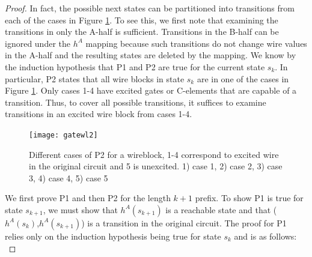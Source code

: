 \documentclass[12pt]{report}
\begin{document}
\begin{proof}
In fact, the possible next states can be partitioned into transitions from each of the cases in Figure \ref{fig:l1helper}.  To see this, we first note that examining the transitions in only the A-half is sufficient.  Transitions in the B-half can be ignored under the $h^A$ mapping because such transitions do not change wire values in the A-half and the resulting states are deleted by the mapping.  We know by the induction hypothesis that P1 and P2 are true for the current state $s_k$.  In particular, P2 states that all wire blocks in state $s_k$ are in one of the cases in Figure \ref{fig:l1helper}.  Only cases 1-4 have excited gates or C-elements that are capable of a transition.  Thus, to cover all possible transitions, it suffices to examine transitions in an excited wire block from cases 1-4. \\

 

\begin{figure}
  \centering
    \texttt{[image: gatewl2]}
  \caption{Different cases of P2 for a wireblock, 1-4 correspond to excited wire in the original circuit and 5 is unexcited.  1) case 1, 2) case 2, 3) case 3, 4) case 4, 5) case 5}
  \label{fig:l1helper}
\end{figure}

We first prove P1 and then P2 for the length $k+1$ prefix.  To show P1 is true for state $s_{k+1}$, we must show that $h^A(s_{k+1})$ is a reachable state and that ($h^A(s_{k})$,$h^A(s_{k+1})$) is a transition in the original circuit.  The proof for P1 relies only on the induction hypothesis being true for state $s_k$ and is as follows: \\


\end{proof}
\end{document}
